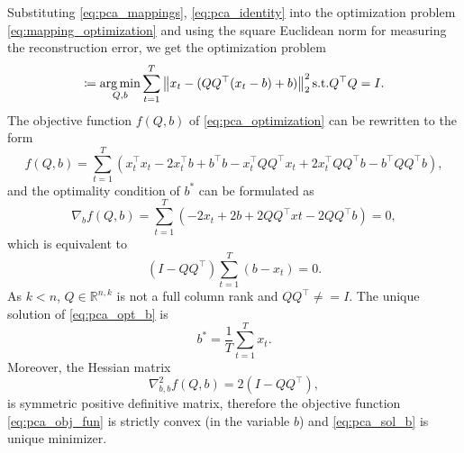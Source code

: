 Substituting \eqref{eq:pca_mappings}, \eqref{eq:pca_identity} into the optimization problem \eqref{eq:mapping_optimization} and using the square Euclidean norm for measuring the reconstruction error, we get the optimization problem
\begin{equation}
    [Q^{*}, b^{*}] \coloneqq \argmin_{Q,b} \sum_{t=1}^T \norm{x_t - (QQ^{\top}(x_t-b) + b)}^2_2 \text{s.t.} Q^{\top}Q=I.
    \label{eq:pca_optimization}
\end{equation}
The objective function $f(Q,b)$ of \eqref{eq:pca_optimization} can be rewritten to the form
\begin{equation}
    f(Q,b)=\sum_{t=1}^T (x_t^{\top}x_t - 2 x_t^{\top}b + b^{\top}b - x_t^{\top}QQ^{\top}x_t + 2x_t^{\top}QQ^{\top}b - b^{\top}QQ^{\top}b),
    \label{eq:pca_obj_fun}
\end{equation}
and the optimality condition of $b^{*}$ can be formulated as
\begin{equation}
    \nabla_bf(Q,b) = \sum_{t=1}^T(-2x_t+2b+2QQ^{\top}xt-2QQ^{\top}b)=0,
\end{equation}
which is equivalent to
\begin{equation}
    (I-QQ^{\top})\sum_{t=1}^T(b-x_t)=0.
    \label{eq:pca_opt_b}
\end{equation}
As $k<n$, $Q \in \mathbb{R}^{n,k}$ is not a full column rank and $QQ^{\top} \neq = I$. The unique solution of \eqref{eq:pca_opt_b} is
\begin{equation}
    b^{*} = \frac{1}{T}\sum_{t=1}^T x_t.
\end{equation}
Moreover, the Hessian matrix
\begin{equation}
    \nabla_{b,b}^2 f(Q,b)=2(I-QQ^{\top}),
    \label{eq:pca_sol_b}
\end{equation}
is symmetric positive definitive matrix, therefore the objective function \eqref{eq:pca_obj_fun} is strictly convex (in the variable $b$) and \eqref{eq:pca_sol_b} is unique minimizer.

